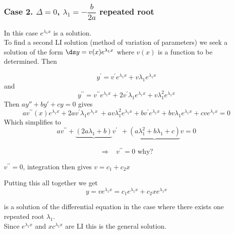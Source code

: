   \begin{frame} \frametitle{Case 2. $\Delta =0$, $\lambda _{1}=-%
   \dfrac{b}{2a}$ repeated root}
In this case  $e^{\lambda _{1}x}$ is a solution.\\
To find a  second LI solution (method of variation of
 parameters) we seek a solution of the form  $\ds   y=v(x)e^{\lambda _{1}x}$ where $v(x)$ is a function to be determined. \pause Then \ 
 
 \begin{equation*}
 y^{\prime }=v^{\prime }e^{\lambda _{1}x}+v\lambda _{1}e^{\lambda _{1}x}
 \end{equation*}
  and 
\[
 y^{\prime \prime }=v^{\prime \prime }e^{\lambda _{1}x}+2v^{\prime }\lambda
 _{1}e^{\lambda _{1}x}+v\lambda _{1}^{2}e^{\lambda _{1}x}
 \]
 \pause 
Then $ay''+by'+cy=0 $  gives 
 \begin{equation*}
 av^{\prime \prime }(x)e^{\lambda _{1}x}+2av^{\prime }\lambda _{1}e^{\lambda
 _{1}x}\ +av\lambda _{1}^{2}e^{\lambda _{1}x}+bv^{\prime }e^{\lambda
 _{1}x}+bv\lambda _{1}e^{\lambda _{1}x}+cve^{\lambda _{1}x}=0
 \end{equation*}
 \pause 
Which simplifies to 
 \begin{equation*}
 av^{\prime \prime }+\underbrace{(2a\lambda _{1}+b)}v^{\prime }\ \ +%
 \underbrace{(a\lambda _{1}^{2}+b\lambda _{1}+c)}v=0
 \end{equation*}%
 
 \[\Rightarrow \;\;\; v^{\prime \prime }=0  \textrm{ why?} \]
 \end{frame}
  
\begin{frame}
  $v^{\prime \prime }=0$, integration then gives  
 $
  v=c_{1}+c_{2}x$\\ \vspace*{3mm}
  
 \pause 
 
 Putting this all together we get
  \begin{equation*}
  y=ve^{\lambda _{1}x}=c_{1}e^{\lambda _{1}x}+c_{2}xe^{\lambda _{1}x}
  \end{equation*}
  
 is a solution of the differential equation in the case where there exists
 one repeated root $\lambda _{1}$. \\
 
 Since $e^{\lambda _{1}x}$ and $xc^{\lambda
 _{1}x}$ are LI this is the general solution.
 
 \end{frame}  
  
